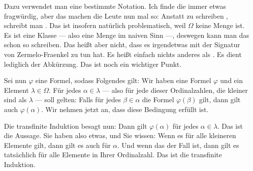\begin{spoken-clean}[00:27:15 - 00:29:30]
Dazu verwendet man eine bestimmte Notation. Ich finde die immer etwas fragwürdig, aber das machen die Leute nun mal so: Anstatt zu schreiben , schreibt man . Das ist insofern natürlich problematisch, weil $\Omega$ keine Menge ist. Es ist eine Klasse --- also eine Menge im naiven Sinn ---, deswegen kann man das schon so schreiben. Das heißt aber nicht, dass es irgendetwas mit der Signatur von Zermelo-Fraenkel zu tun hat. Es heißt einfach nichts anderes als . Es dient lediglich der Abkürzung. Das ist noch ein wichtiger Punkt.

Sei nun $\varphi$ eine Formel, sodass Folgendes gilt: Wir haben eine Formel $\varphi$ und ein Element $\lambda \in \Omega$. Für jedes $\alpha \in \lambda$ --- also für jede dieser Ordinalzahlen, die kleiner sind als $\lambda$ --- soll gelten: Falls für jedes $\beta \in \alpha$ die Formel $\varphi(\beta)$ gilt, dann gilt auch $\varphi(\alpha)$. Wir nehmen jetzt an, dass diese Bedingung erfüllt ist.

Die transfinite Induktion besagt nun: Dann gilt $\varphi(\alpha)$ für jedes $\alpha \in \lambda$. Das ist die Aussage. Sie haben also etwas, und Sie wissen: Wenn es für alle kleineren Elemente gilt, dann gilt es auch für $\alpha$. Und wenn das der Fall ist, dann gilt es tatsächlich für alle Elemente in Ihrer Ordinalzahl. Das ist die transfinite Induktion.
\end{spoken-clean}

\begin{math-stroke}
\end{math-stroke}

\begin{ai-global-state-checkpoint-invisible-content}
\end{ai-global-state-checkpoint-invisible-content}

